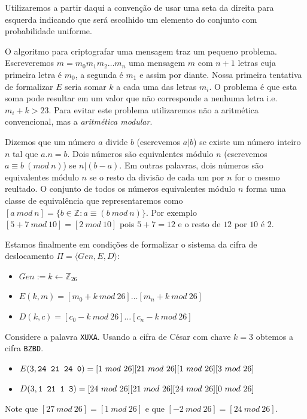 Utilizaremos a partir daqui a convenção de usar uma seta da direita para esquerda indicando que será escolhido um elemento do conjunto com probabilidade uniforme.

O algoritmo para criptografar uma mensagem traz um pequeno problema.
Escreveremos $m = m_0 m_1 m_2 \dots m_n$ uma mensagem $m$ com $n + 1$ letras cuja primeira letra é $m_0$, a segunda é $m_1$ e assim por diante.
Nossa primeira tentativa de formalizar $E$ seria somar $k$ a cada uma das letras $m_i$.
O problema é que esta soma pode resultar em um valor que não corresponde a nenhuma letra i.e. $m_i + k > 23$.
Para evitar este problema utilizaremos não a aritmética convencional, mas a {\em aritmética modular}.

Dizemos que um número $a$ divide $b$ (escrevemos $a|b$) se existe um número inteiro $n$ tal que $a.n = b$.
Dois números são equivalentes módulo $n$ (escrevemos $a \equiv b\ (mod\ n)$) se $n|(b-a)$.
Em outras palavras, dois números são equivalentes módulo $n$ se o resto da divisão de cada um por $n$ for o mesmo reultado.
O conjunto de todos os números equivalentes módulo $n$ forma uma classe de equivalência que representaremos como $[a\ mod\ n] = \{b \in \mathbb{Z} : a \equiv (b\ mod\ n)\}$.
Por exemplo $[5 + 7\ mod\ 10] = [2\ mod\ 10]$ pois $5 + 7 = 12$ e o resto de $12$ por $10$ é $2$.

Estamos finalmente em condições de formalizar o sistema da cifra de deslocamento $\Pi = \langle Gen, E, D\rangle$:
\begin{itemize}
\item $Gen := k \leftarrow \mathbb{Z}_{26}$
\item $E(k, m) = [m_0 + k\ mod\ 26] \dots [m_n + k\ mod\ 26]$
\item $D(k, c) = [c_0 - k\ mod\ 26] \dots [c_n - k\ mod\ 26]$
\end{itemize}


\begin{example}
  Considere a palavra {\tt XUXA}.
  Usando a cifra de César com chave $k = 3$ obtemos a cifra {\tt BZBD}.

  \begin{itemize}
  \item $E(3, \textrm{\tt 24 21 24 0}) = [1\ mod\ 26] [21\ mod\ 26] [1\ mod\ 26] [3\ mod\ 26]$
  \item $D(3, \textrm{\tt 1 21 1 3}) = [24\ mod\ 26] [21\ mod\ 26] [24\ mod\ 26] [0\ mod\ 26]$
  \end{itemize}

  Note que $[27\ mod\ 26] = [1\ mod\ 26]$ e que $[-2\ mod\ 26] = [24\ mod\ 26]$.
\end{example}



